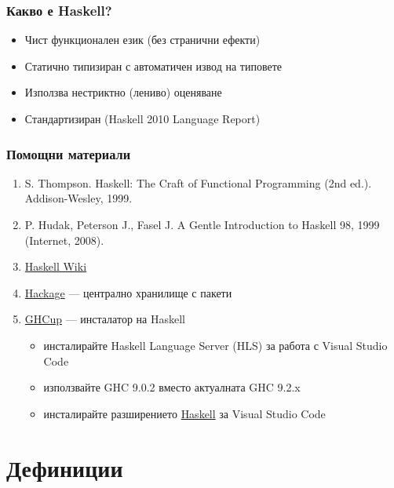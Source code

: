\documentclass[alsotrans]{beamerswitch}
\begin{document}
\lstset{basicstyle=\ttfamily}

\begin{frame}
  \frametitle{Какво е Haskell?}

  \pause
  \begin{itemize}
  \item Чист функционален език (без странични ефекти)
  \item Статично типизиран с автоматичен извод на типовете
  \item Използва нестриктно (лениво) оценяване
  \item Стандартизиран (Haskell 2010 Language Report)
  \end{itemize}
\end{frame}

\begin{frame}
  \frametitle{Помощни материали}

  \begin{enumerate}
  \item S. Thompson. Haskell: The Craft of Functional Programming (2nd ed.). Addison-Wesley, 1999.
  \item P. Hudak, Peterson J., Fasel J. A Gentle Introduction to Haskell 98, 1999 (Internet, 2008).
  \item \href{https://wiki.haskell.org/Haskell}{Haskell Wiki}
  \item \href{https://hackage.haskell.org/}{Hackage} --- централно хранилище с пакети
  \item \href{https://www.haskell.org/ghcup/}{GHCup} --- инсталатор на Haskell
    \begin{itemize}
    \item инсталирайте Haskell Language Server (HLS) за работа с Visual Studio Code
    \item използвайте GHC 9.0.2 вместо актуалната GHC 9.2.x
    \item инсталирайте разширението \href{https://marketplace.visualstudio.com/items?itemName=haskell.haskell}{Haskell} за Visual Studio Code
    \end{itemize}
  \end{enumerate}
\end{frame}

\section{Дефиниции}
\end{document}
